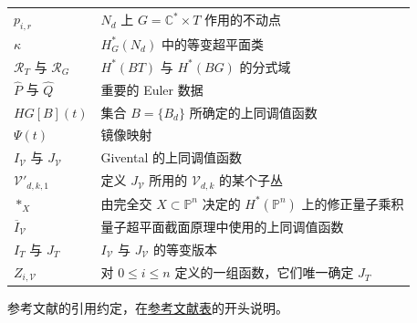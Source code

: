 \begin{longtable}{@{}p{}p{}@{}}
$p_{i,r}$ & $N_d$ 上 $G=\mathbb C^*\times T$ 作用的不动点\\
$\kappa$ & $H_G^*(N_d)$ 中的等变超平面类\\
$\mathcal R_T$ 与 $\mathcal R_G$ & $H^*(BT)$ 与 $H^*(BG)$ 的分式域\\
$\widehat P$ 与 $\widehat Q$ & 重要的 Euler 数据\\
$HG[B](t)$ & 集合 $B=\{B_d\}$ 所确定的上同调值函数\\
$\Psi(t)$ & 镜像映射\\
$I_{\mathcal V}$ 与 $J_{\mathcal V}$ & Givental 的上同调值函数\\
$\mathcal V'_{d,k,1}$ & 定义 $J_{\mathcal V}$ 所用的 $\mathcal V_{d,k}$ 的某个子丛\\
$*_X$ & 由完全交 $X\subset\mathbb P^n$ 决定的 $H^*(\mathbb P^n)$ 上的修正量子乘积\\
$\overline I_{\mathcal V}$ & 量子超平面截面原理中使用的上同调值函数\\
$I_T$ 与 $J_T$ & $I_{\mathcal V}$ 与 $J_{\mathcal V}$ 的等变版本\\
$Z_{i,\mathcal V}$ & 对 $0\le i\le n$ 定义的一组函数，它们唯一确定 $J_T$\\
\bottomrule
\end{longtable}
\endgroup

参考文献的引用约定，在\hyperlink{source:460}{参考文献表}的开头说明。
